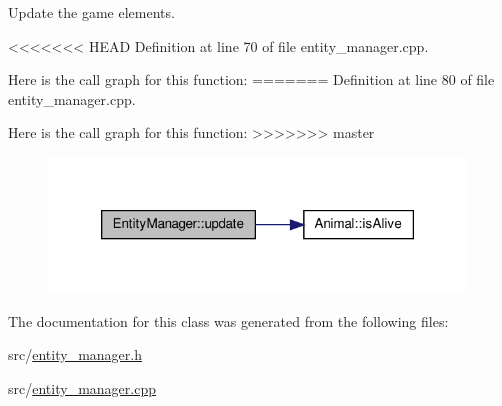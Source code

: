Update the game elements. 



<<<<<<< HEAD
Definition at line 70 of file entity\-\_\-manager.\-cpp.



Here is the call graph for this function\-:
\nopagebreak
=======
Definition at line 80 of file entity\-\_\-manager.\-cpp.



Here is the call graph for this function\-:\nopagebreak
>>>>>>> master
\begin{figure}[H]
\begin{center}
\leavevmode
\includegraphics[width=314pt]{class_entity_manager_abc6a2cc5077501f4b06d88f4ed3e7e31_cgraph}
\end{center}
\end{figure}




The documentation for this class was generated from the following files\-:\begin{DoxyCompactItemize}
\item 
src/\hyperlink{entity__manager_8h}{entity\-\_\-manager.\-h}\item 
src/\hyperlink{entity__manager_8cpp}{entity\-\_\-manager.\-cpp}\end{DoxyCompactItemize}
